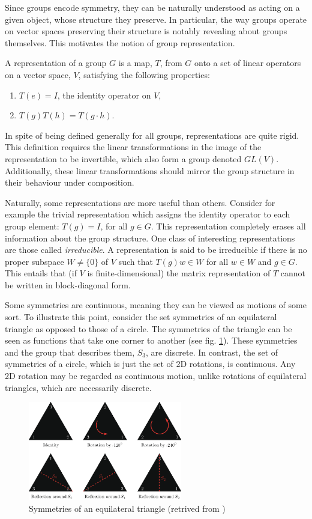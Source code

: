 Since groups encode symmetry, they can be naturally understood as acting on a given object, whose structure they preserve. In particular, the way groups operate on vector spaces preserving their structure is notably revealing about groups themselves. This motivates the notion of group representation.
\begin{newdef}
A representation of a group $G$ is a map, $T$, from $G$ onto a set of linear operators on a vector space, $V$, satisfying the following properties:
\begin{enumerate}
    \item $T(e) = I$, the identity operator on $V$,
    \item $T(g)T(h) = T(g\cdot h)$.
\end{enumerate}
\end{newdef}
In spite of being defined generally for all groups, representations are quite rigid. This definition requires the linear transformations in the image of the representation to be invertible, which also form a group denoted $GL(V)$. Additionally, these linear transformations should mirror the group structure in their behaviour under composition. 

Naturally, some representations are more useful than others. Consider for example the trivial representation which assigns the identity operator to each group element: $T(g) = I$, for all $g\in G$. This representation completely erases all information about the group structure. One class of interesting representations are those called \textit{irreducible}. A representation is said to be irreducible if there is no proper subspace $W\neq \{0\}$ of $V$ such that $T(g)w \in W$ for all $w\in W$ and $g\in G$. This entails that (if $V$ is finite-dimensional) the matrix representation of $T$ cannot be written in block-diagonal form.

Some symmetries are continuous, meaning they can be viewed as motions of some sort. To illustrate this point, consider the set symmetries of an equilateral triangle as opposed to those of a circle. The symmetries of the triangle can be seen as functions that take one corner to another (see fig. \ref{fig:triangle}). These symmetries and the group that describes them, $S_3$, are discrete. In contrast, the set of symmetries of a circle, which is just the set of 2D rotations, is continuous. Any 2D rotation may be regarded as continuous motion, unlike rotations of equilateral triangles, which are necessarily discrete.
\begin{figure}[t]
    \centering
    \includegraphics[width = 0.6\textwidth]{images/triangle_symmetries.png}
    \caption{Symmetries of an equilateral triangle (retrived from \cite{raviv_full_2010})}
    \label{fig:triangle}
\end{figure}

